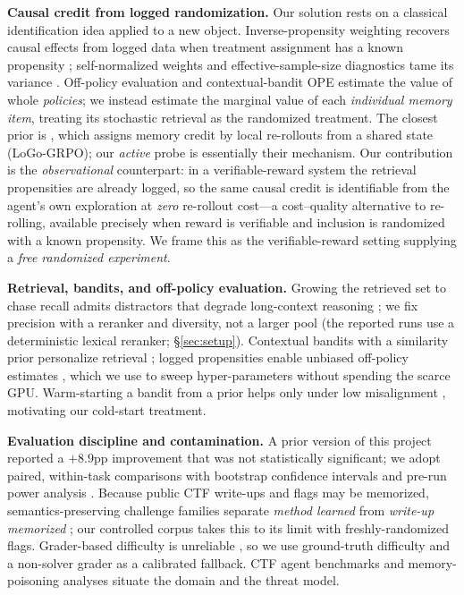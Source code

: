 \documentclass[10pt,twocolumn]{article}
\begin{document}
\textbf{Causal credit from logged randomization.} Our solution rests on a classical
identification idea applied to a new object. Inverse-propensity weighting recovers
causal effects from logged data when treatment assignment has a known propensity
\citep{OfflineEval,DoublyRobust}; self-normalized weights and effective-sample-size
diagnostics tame its variance \citep{DoublyRobust}. Off-policy evaluation
\citep{OfflineEval} and contextual-bandit OPE estimate the value of whole
\emph{policies}; we instead estimate the marginal value of each \emph{individual
memory item}, treating its stochastic retrieval as the randomized treatment. The
closest prior is \citet{MemoryR2}, which assigns memory credit by local
re-rollouts from a shared state (LoGo-GRPO); our \emph{active} probe is essentially
their mechanism. Our contribution is the \emph{observational} counterpart: in a
verifiable-reward system the retrieval propensities are already logged, so the same
causal credit is identifiable from the agent's own exploration at \emph{zero}
re-rollout cost---a cost--quality alternative to re-rolling, available precisely
when reward is verifiable and inclusion is randomized with a known propensity. We
frame this as the verifiable-reward setting supplying a \emph{free randomized
experiment}.

\textbf{Retrieval, bandits, and off-policy evaluation.} Growing the retrieved set
to chase recall admits distractors that degrade long-context reasoning
\citep{LongContextMeetsRAG,DynamicContextSelection}; we fix precision with a
reranker \citep{CrossEncoderVsLLM} and diversity, not a larger pool (the reported
runs use a deterministic lexical reranker; \S\ref{sec:setup}).
Contextual bandits with a similarity prior personalize retrieval
\citep{PURPLE,LinUCB}; logged propensities enable unbiased off-policy estimates
\citep{OfflineEval,DoublyRobust}, which we use to sweep hyper-parameters without
spending the scarce GPU. Warm-starting a bandit from a prior helps only under low
misalignment \citep{JumpStartFalseStart}, motivating our cold-start treatment.

\textbf{Evaluation discipline and contamination.} A prior version of this project
reported a $+8.9$pp improvement that was not statistically significant; we adopt
paired, within-task comparisons with bootstrap confidence intervals and pre-run
power analysis \citep{PairedBootstrap,ErrorBarsToEvals}. Because public CTF
write-ups and flags may be memorized, semantics-preserving challenge families
separate \emph{method learned} from \emph{write-up memorized} \citep{CaptureTheFlags};
our controlled corpus takes this to its limit with freshly-randomized flags. Grader-based difficulty is unreliable
\citep{CannotSelfCorrect,JudgingTheJudges}, so we use ground-truth difficulty and
a non-solver grader as a calibrated fallback. CTF agent benchmarks
\citep{Cybench,NYUCTFBench,CyberGym} and memory-poisoning analyses
\citep{MemoryGraft,PoisonedRAG,MemoryPoisoningDefense} situate the domain and the
threat model.
\end{document}
